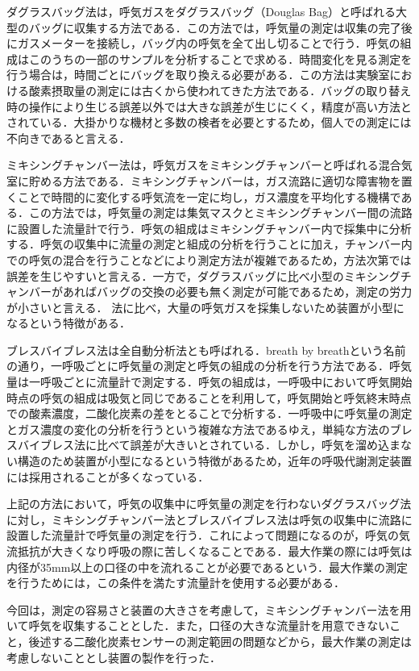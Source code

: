 ダグラスバッグ法は，呼気ガスをダグラスバッグ（Douglas Bag）と呼ばれる大型のバッグに収集する方法である．この方法では，呼気量の測定は収集の完了後にガスメーターを接続し，バッグ内の呼気を全て出し切ることで行う．呼気の組成はこのうちの一部のサンプルを分析することで求める．時間変化を見る測定を行う場合は，時間ごとにバッグを取り換える必要がある．この方法は実験室における酸素摂取量の測定には古くから使われてきた方法である．バッグの取り替え時の操作により生じる誤差以外では大きな誤差が生じにくく，精度が高い方法とされている．大掛かりな機材と多数の検者を必要とするため，個人での測定には不向きであると言える．

ミキシングチャンバー法は，呼気ガスをミキシングチャンバーと呼ばれる混合気室に貯める方法である．ミキシングチャンバーは，ガス流路に適切な障害物を置くことで時間的に変化する呼気流を一定に均し，ガス濃度を平均化する機構である\cite{whats_mixing_chamber}．この方法では，呼気量の測定は集気マスクとミキシングチャンバー間の流路に設置した流量計で行う．呼気の組成はミキシングチャンバー内で採集中に分析する．呼気の収集中に流量の測定と組成の分析を行うことに加え，チャンバー内での呼気の混合を行うことなどにより測定方法が複雑であるため，方法次第では誤差を生じやすいと言える．一方で，ダグラスバッグに比べ小型のミキシングチャンバーがあればバッグの交換の必要も無く測定が可能であるため，測定の労力が小さいと言える．
法に比べ，大量の呼気ガスを採集しないため装置が小型になるという特徴がある．

ブレスバイブレス法は全自動分析法とも呼ばれる．breath by breathという名前の通り，一呼吸ごとに呼気量の測定と呼気の組成の分析を行う方法である．呼気量は一呼吸ごとに流量計で測定する．呼気の組成は，一呼吸中において呼気開始時点の呼気の組成は吸気と同じであることを利用して，呼気開始と呼気終末時点での酸素濃度，二酸化炭素の差をとることで分析する．一呼吸中に呼気量の測定とガス濃度の変化の分析を行うという複雑な方法であるゆえ，単純な方法のブレスバイブレス法に比べて誤差が大きいとされている．しかし，呼気を溜め込まない構造のため装置が小型になるという特徴があるため，近年の呼吸代謝測定装置には採用されることが多くなっている．

上記の方法において，呼気の収集中に呼気量の測定を行わないダグラスバッグ法に対し，ミキシングチャンバー法とブレスバイブレス法は呼気の収集中に流路に設置した流量計で呼気量の測定を行う．これによって問題になるのが，呼気の気流抵抗が大きくなり呼吸の際に苦しくなることである．最大作業の際には呼気は内径が35mm以上の口径の中を流れることが必要であるという\cite{science_of_vo2}．最大作業の測定を行うためには，この条件を満たす流量計を使用する必要がある．

今回は，測定の容易さと装置の大きさを考慮して，ミキシングチャンバー法を用いて呼気を収集することとした．また，口径の大きな流量計を用意できないこと，後述する二酸化炭素センサーの測定範囲の問題などから，最大作業の測定は考慮しないこととし装置の製作を行った．

